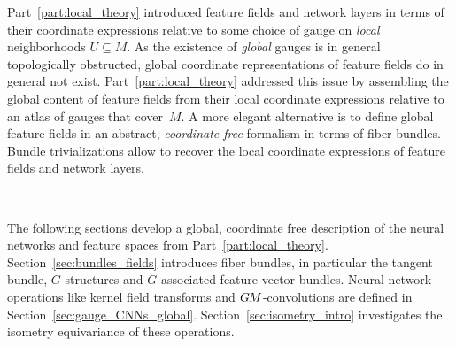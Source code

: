

\label{part:bundle_theory}

Part~\ref{part:local_theory} introduced feature fields and network layers in terms of their coordinate expressions relative to some choice of gauge on \emph{local} neighborhoods $U\subseteq M$.
As the existence of \emph{global} gauges is in general topologically obstructed, global coordinate representations of feature fields do in general not exist.
Part~\ref{part:local_theory} addressed this issue by assembling the global content of feature fields from their local coordinate expressions relative to an atlas of gauges that cover~$M$.
A more elegant alternative is to define global feature fields in an abstract, \emph{coordinate free} formalism in terms of fiber bundles.
Bundle trivializations allow to recover the local coordinate expressions of feature fields and network layers.

\etocsettocstyle{}{} %
\localtableofcontents

~

The following sections develop a global, coordinate free description of the neural networks and feature spaces from Part~\ref{part:local_theory}.
Section~\ref{sec:bundles_fields} introduces fiber bundles, in particular the tangent bundle, $G$-structures and $G$-associated feature vector bundles.
Neural network operations like kernel field transforms and $G\mkern-1.4muM$-convolutions are defined in Section~\ref{sec:gauge_CNNs_global}.
Section~\ref{sec:isometry_intro} investigates the isometry equivariance of these operations.
